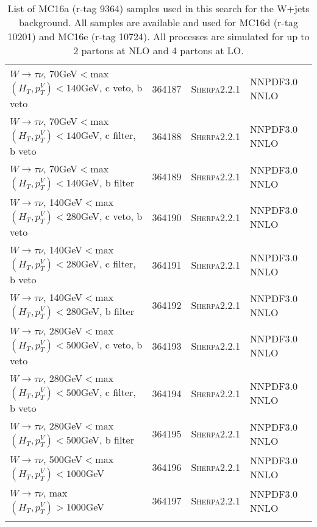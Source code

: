 \begin{table}[h!]
\begin{center}
{\begin{tabular}{@{} lcll @{}}
$W\rightarrow \tau\nu$, 70GeV$<$max$(H_T,p_T^V)<140$GeV, c veto, b veto & 364187& \textsc{Sherpa2.2.1} &NNPDF3.0 NNLO \\
$W\rightarrow \tau\nu$, 70GeV$<$max$(H_T,p_T^V)<140$GeV, c filter, b veto & 364188& \textsc{Sherpa2.2.1} &NNPDF3.0 NNLO \\
$W\rightarrow \tau\nu$, 70GeV$<$max$(H_T,p_T^V)<140$GeV, b filter & 364189& \textsc{Sherpa2.2.1} &NNPDF3.0 NNLO \\
$W\rightarrow \tau\nu$, 140GeV$<$max$(H_T,p_T^V)<280$GeV, c veto, b veto & 364190&  \textsc{Sherpa2.2.1} &NNPDF3.0 NNLO \\
$W\rightarrow \tau\nu$, 140GeV$<$max$(H_T,p_T^V)<280$GeV, c filter, b veto & 364191& \textsc{Sherpa2.2.1} &NNPDF3.0 NNLO \\
$W\rightarrow \tau\nu$, 140GeV$<$max$(H_T,p_T^V)<280$GeV, b filter & 364192& \textsc{Sherpa2.2.1} &NNPDF3.0 NNLO \\
$W\rightarrow \tau\nu$, 280GeV$<$max$(H_T,p_T^V)<500$GeV, c veto, b veto & 364193& \textsc{Sherpa2.2.1} &NNPDF3.0 NNLO \\
$W\rightarrow \tau\nu$, 280GeV$<$max$(H_T,p_T^V)<500$GeV, c filter, b veto & 364194& \textsc{Sherpa2.2.1} &NNPDF3.0 NNLO \\
$W\rightarrow \tau\nu$, 280GeV$<$max$(H_T,p_T^V)<500$GeV, b filter &  364195& \textsc{Sherpa2.2.1} &NNPDF3.0 NNLO \\
$W\rightarrow \tau\nu$, 500GeV$<$max$(H_T,p_T^V)<1000$GeV & 364196& \textsc{Sherpa2.2.1} &NNPDF3.0 NNLO \\
$W\rightarrow \tau\nu$, max$(H_T,p_T^V)>1000$GeV&  364197&		 \textsc{Sherpa2.2.1} &NNPDF3.0 NNLO \\
 \hhline{====}
\end{tabular}
\caption{List of MC16a (r-tag  9364) samples used in this search for the W+jets background.  All samples are available and used for MC16d (r-tag 10201) and MC16e (r-tag 10724). All processes are simulated for up to 2 partons at NLO and 4 partons at LO.}
\label{tab:MCSample3}
}
\end{center}
\end{table}



